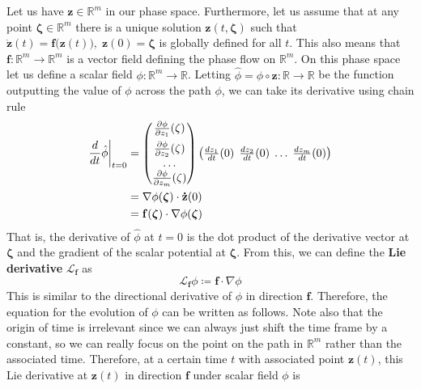       Let us have $\mathbf{z} \in \mathbb{R}^m$ in our phase space. Furthermore, let us assume that at any point $\boldsymbol{\zeta} \in \mathbb{R}^m$ there is a unique solution $\mathbf{z}(t, \boldsymbol{\zeta})$ such that $\mathbf{\dot{z}}(t) = \mathbf{f}\big(\mathbf{z}(t)\big), \; \mathbf{z}(0) = \boldsymbol{\zeta}$ is globally defined for all $t$. This also means that $\mathbf{f}: \mathbb{R}^m \longrightarrow \mathbb{R}^m$ is a vector field defining the phase flow on $\mathbb{R}^m$. On this phase space let us define a scalar field $\phi: \mathbb{R}^m \longrightarrow \mathbb{R}$. Letting $\hat{\phi} = \phi \circ \mathbf{z}: \mathbb{R} \longrightarrow \mathbb{R}$ be the function outputting the value of $\phi$ across the path $\phi$, we can take its derivative using chain rule
      \begin{align*}
        \frac{d}{dt} \hat{\phi} \bigg|_{t=0} & = \begin{pmatrix}
        \frac{\partial \phi}{\partial z_1} (\zeta) \\[0.5em]
        \frac{\partial \phi}{\partial z_2} (\zeta) \\
        \ldots \\ 
        \frac{\partial \phi}{\partial z_m} (\zeta) \end{pmatrix} 
        \begin{pmatrix}
        \frac{d z_1}{dt} (0) &\hspace{-2mm} \frac{d z_2}{dt} (0) &\hspace{-2mm} \ldots &\hspace{-2mm} \frac{d z_m}{dt} (0) \end{pmatrix} \\
        & = \nabla \phi(\boldsymbol{\zeta}) \cdot \mathbf{\dot{z}} (0) \\ 
        & = \mathbf{f}(\boldsymbol{\zeta}) \cdot \nabla \phi(\boldsymbol{\zeta}) 
      \end{align*}
      That is, the derivative of $\hat{\phi}$ at $t = 0$ is the dot product of the derivative vector at $\boldsymbol{\zeta}$ and the gradient of the scalar potential at $\boldsymbol{\zeta}$. From this, we can define the \textbf{Lie derivative} $\mathcal{L}_\mathbf{f}$ as 
      \begin{equation}
        \mathcal{L}_\mathbf{f} \phi \coloneqq \mathbf{f} \cdot \nabla \phi
      \end{equation}
      This is similar to the directional derivative of $\phi$ in direction $\mathbf{f}$. Therefore, the equation for the evolution of $\phi$ can be written as follows. Note also that the origin of time is irrelevant since we can always just shift the time frame by a constant, so we can really focus on the point on the path in $\mathbb{R}^m$ rather than the associated time. Therefore, at a certain time $t$ with associated point $\mathbf{z}(t)$, this Lie derivative at $\mathbf{z}(t)$ in direction $\mathbf{f}$ under scalar field $\phi$ is 
